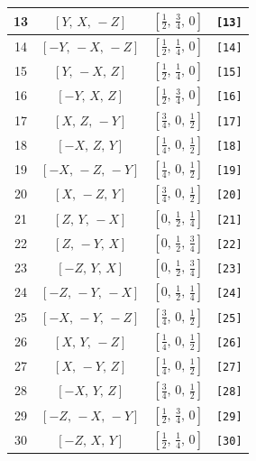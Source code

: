 \documentclass[fleqn,8pt]{jsarticle}
\begin{document}
\begin{longtable}{cccc}
13 & $\left[ Y,\, X,\, - Z \right]$ & $\left[ \frac{1}{2},\, \frac{3}{4},\, 0 \right]$ & {\tt [13]} \\ \hline
14 & $\left[ - Y,\, - X,\, - Z \right]$ & $\left[ \frac{1}{2},\, \frac{1}{4},\, 0 \right]$ & {\tt [14]} \\ \hline
15 & $\left[ Y,\, - X,\, Z \right]$ & $\left[ \frac{1}{2},\, \frac{1}{4},\, 0 \right]$ & {\tt [15]} \\ \hline
16 & $\left[ - Y,\, X,\, Z \right]$ & $\left[ \frac{1}{2},\, \frac{3}{4},\, 0 \right]$ & {\tt [16]} \\ \hline
17 & $\left[ X,\, Z,\, - Y \right]$ & $\left[ \frac{3}{4},\, 0,\, \frac{1}{2} \right]$ & {\tt [17]} \\ \hline
18 & $\left[ - X,\, Z,\, Y \right]$ & $\left[ \frac{1}{4},\, 0,\, \frac{1}{2} \right]$ & {\tt [18]} \\ \hline
19 & $\left[ - X,\, - Z,\, - Y \right]$ & $\left[ \frac{1}{4},\, 0,\, \frac{1}{2} \right]$ & {\tt [19]} \\ \hline
20 & $\left[ X,\, - Z,\, Y \right]$ & $\left[ \frac{3}{4},\, 0,\, \frac{1}{2} \right]$ & {\tt [20]} \\ \hline
21 & $\left[ Z,\, Y,\, - X \right]$ & $\left[ 0,\, \frac{1}{2},\, \frac{1}{4} \right]$ & {\tt [21]} \\ \hline
22 & $\left[ Z,\, - Y,\, X \right]$ & $\left[ 0,\, \frac{1}{2},\, \frac{3}{4} \right]$ & {\tt [22]} \\ \hline
23 & $\left[ - Z,\, Y,\, X \right]$ & $\left[ 0,\, \frac{1}{2},\, \frac{3}{4} \right]$ & {\tt [23]} \\ \hline
24 & $\left[ - Z,\, - Y,\, - X \right]$ & $\left[ 0,\, \frac{1}{2},\, \frac{1}{4} \right]$ & {\tt [24]} \\ \hline
25 & $\left[ - X,\, - Y,\, - Z \right]$ & $\left[ \frac{3}{4},\, 0,\, \frac{1}{2} \right]$ & {\tt [25]} \\ \hline
26 & $\left[ X,\, Y,\, - Z \right]$ & $\left[ \frac{1}{4},\, 0,\, \frac{1}{2} \right]$ & {\tt [26]} \\ \hline
27 & $\left[ X,\, - Y,\, Z \right]$ & $\left[ \frac{1}{4},\, 0,\, \frac{1}{2} \right]$ & {\tt [27]} \\ \hline
28 & $\left[ - X,\, Y,\, Z \right]$ & $\left[ \frac{3}{4},\, 0,\, \frac{1}{2} \right]$ & {\tt [28]} \\ \hline
29 & $\left[ - Z,\, - X,\, - Y \right]$ & $\left[ \frac{1}{2},\, \frac{3}{4},\, 0 \right]$ & {\tt [29]} \\ \hline
30 & $\left[ - Z,\, X,\, Y \right]$ & $\left[ \frac{1}{2},\, \frac{1}{4},\, 0 \right]$ & {\tt [30]} \\ \hline

\end{longtable}
\end{document}
